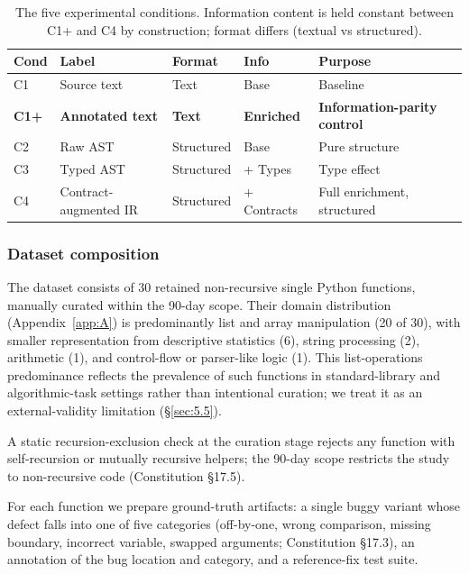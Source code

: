 \documentclass[11pt]{article}
\begin{document}
\begin{table}[h]
\centering
\small
\caption{The five experimental conditions. Information content is held
constant between C1+ and C4 by construction; format differs (textual vs
structured).}
\label{tab:conditions}
\begin{tabular}{llllll}
\toprule
Cond & Label & Format & Info & Purpose \\
\midrule
C1   & Source text             & Text       & Base       & Baseline \\
\textbf{C1+} & \textbf{Annotated text} & \textbf{Text}       & \textbf{Enriched}   & \textbf{Information-parity control} \\
C2   & Raw AST                 & Structured & Base       & Pure structure \\
C3   & Typed AST               & Structured & + Types    & Type effect \\
C4   & Contract-augmented IR   & Structured & + Contracts & Full enrichment, structured \\
\bottomrule
\end{tabular}
\end{table}

\subsubsection{Dataset composition}
\label{sec:3.1.2}
The dataset consists of 30 retained non-recursive single Python
functions, manually curated within the 90-day scope. Their domain
distribution (Appendix~\ref{app:A}) is predominantly list and
array manipulation (20 of 30), with smaller representation from
descriptive statistics (6), string processing (2), arithmetic (1),
and control-flow or parser-like logic (1). This list-operations
predominance reflects the prevalence of such functions in
standard-library and algorithmic-task settings rather than
intentional curation; we treat it as an external-validity limitation
(\S\ref{sec:5.5}).

A static recursion-exclusion check at the curation stage rejects any
function with self-recursion or mutually recursive helpers; the
90-day scope restricts the study to non-recursive code
(Constitution \S17.5).

For each function we prepare ground-truth artifacts: a single buggy
variant whose defect falls into one of five categories (off-by-one,
wrong comparison, missing boundary, incorrect variable, swapped
arguments; Constitution \S17.3), an annotation of the bug location
and category, and a reference-fix test suite.
\end{document}
